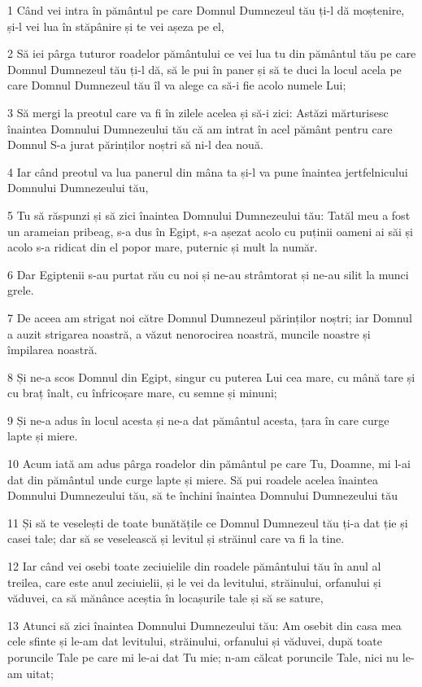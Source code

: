 \par 1 Când vei intra în pământul pe care Domnul Dumnezeul tău ți-l dă moștenire, și-l vei lua în stăpânire și te vei așeza pe el,
\par 2 Să iei pârga tuturor roadelor pământului ce vei lua tu din pământul tău pe care Domnul Dumnezeul tău ți-l dă, să le pui în paner și să te duci la locul acela pe care Domnul Dumnezeul tău îl va alege ca să-i fie acolo numele Lui;
\par 3 Să mergi la preotul care va fi în zilele acelea și să-i zici: Astăzi mărturisesc înaintea Domnului Dumnezeului tău că am intrat în acel pământ pentru care Domnul S-a jurat părinților noștri să ni-l dea nouă.
\par 4 Iar când preotul va lua panerul din mâna ta și-l va pune înaintea jertfelnicului Domnului Dumnezeului tău,
\par 5 Tu să răspunzi și să zici înaintea Domnului Dumnezeului tău: Tatăl meu a fost un arameian pribeag, s-a dus în Egipt, s-a așezat acolo cu puținii oameni ai săi și acolo s-a ridicat din el popor mare, puternic și mult la număr.
\par 6 Dar Egiptenii s-au purtat rău cu noi și ne-au strâmtorat și ne-au silit la munci grele.
\par 7 De aceea am strigat noi către Domnul Dumnezeul părinților noștri; iar Domnul a auzit strigarea noastră, a văzut nenorocirea noastră, muncile noastre și împilarea noastră.
\par 8 Și ne-a scos Domnul din Egipt, singur cu puterea Lui cea mare, cu mână tare și cu braț înalt, cu înfricoșare mare, cu semne și minuni;
\par 9 Și ne-a adus în locul acesta și ne-a dat pământul acesta, țara în care curge lapte și miere.
\par 10 Acum iată am adus pârga roadelor din pământul pe care Tu, Doamne, mi l-ai dat din pământul unde curge lapte și miere. Să pui roadele acelea înaintea Domnului Dumnezeului tău, să te închini înaintea Domnului Dumnezeului tău
\par 11 Și să te veselești de toate bunătățile ce Domnul Dumnezeul tău ți-a dat ție și casei tale; dar să se veselească și levitul și străinul care va fi la tine.
\par 12 Iar când vei osebi toate zeciuielile din roadele pământului tău în anul al treilea, care este anul zeciuielii, și le vei da levitului, străinului, orfanului și văduvei, ca să mănânce aceștia în locașurile tale și să se sature,
\par 13 Atunci să zici înaintea Domnului Dumnezeului tău: Am osebit din casa mea cele sfinte și le-am dat levitului, străinului, orfanului și văduvei, după toate poruncile Tale pe care mi le-ai dat Tu mie; n-am călcat poruncile Tale, nici nu le-am uitat;
